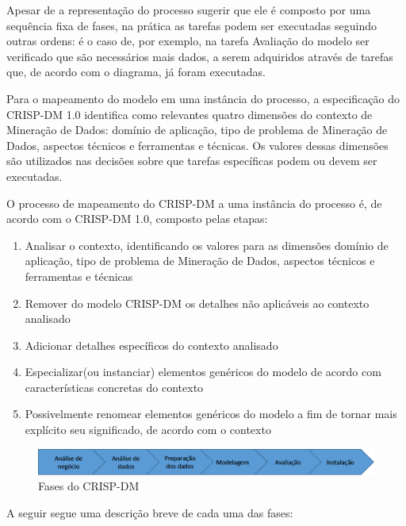 Apesar de a representação do processo sugerir que ele é composto por uma sequência fixa de fases, na prática as tarefas podem ser executadas seguindo outras ordens: é o caso de, por exemplo, na tarefa Avaliação do modelo ser verificado que são necessários mais dados, a serem adquiridos através de tarefas que, de acordo com o diagrama, já foram executadas.

Para o mapeamento do modelo em uma instância do processo, a especificação do CRISP-DM 1.0 identifica como relevantes quatro dimensões do contexto de Mineração de Dados: domínio de aplicação, tipo de problema de Mineração de Dados, aspectos técnicos e ferramentas e técnicas. Os valores dessas dimensões são utilizados nas decisões sobre que tarefas específicas podem ou devem ser executadas.

O processo de mapeamento do CRISP-DM a uma instância do processo é, de acordo com o CRISP-DM 1.0, composto pelas etapas:
\begin{enumerate}
\item Analisar o contexto, identificando os valores para as dimensões domínio de aplicação, tipo de problema de Mineração de Dados, aspectos técnicos e ferramentas e técnicas
\item Remover do modelo CRISP-DM os detalhes não aplicáveis ao contexto analisado
\item Adicionar detalhes específicos do contexto analisado
\item Especializar(ou instanciar) elementos genéricos do modelo de acordo com características concretas do contexto
\item Possivelmente renomear elementos genéricos do modelo a fim de tornar mais explícito seu significado, de acordo com o contexto
\end{enumerate}


\begin{figure}[H]
	\includegraphics[scale=0.8]{img/CRISP-DM-main.png}
	\caption{Fases do CRISP-DM}
	\label{img:CRISP-DM-diagram}
\end{figure}

A seguir segue uma descrição breve de cada uma das fases:

